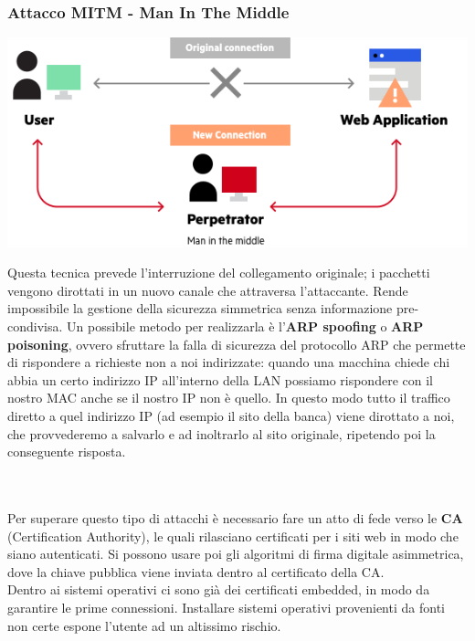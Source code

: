 \documentclass[10pt,a4paper,twoside]{article}
\begin{document}
\subsubsection{Attacco MITM - Man In The Middle}
\begin{minipage}{0.45\textwidth}
\includegraphics[width=\textwidth]{images/mitm.png}
\end{minipage}
\begin{minipage}{0.55\textwidth}
Questa tecnica prevede l'interruzione del collegamento originale; i pacchetti vengono dirottati in un nuovo canale che attraversa l'attaccante. Rende impossibile la gestione della sicurezza simmetrica senza informazione pre-condivisa. Un possibile metodo per realizzarla è l'\textbf{ARP spoofing} o \textbf{ARP poisoning}, ovvero sfruttare la falla di sicurezza del protocollo ARP che permette di rispondere a richieste non a noi indirizzate: quando una macchina chiede chi abbia un certo indirizzo IP all'interno della LAN possiamo rispondere con il nostro MAC anche se il nostro IP non è quello. In questo modo tutto il traffico diretto a quel indirizzo IP (ad esempio il sito della banca) viene dirottato a noi, che provvederemo a salvarlo e ad inoltrarlo al sito originale, ripetendo poi la conseguente risposta.
\end{minipage}\\\\
Per superare questo tipo di attacchi è necessario fare un atto di fede verso le \textbf{CA} (Certification Authority), le quali rilasciano certificati per i siti web in modo che siano autenticati. Si possono usare poi gli algoritmi di firma digitale asimmetrica, dove la chiave pubblica viene inviata dentro al certificato della CA.\\
Dentro ai sistemi operativi ci sono già dei certificati embedded, in modo da garantire le prime connessioni. Installare sistemi operativi provenienti da fonti non certe espone l'utente ad un altissimo rischio.
\end{document}
